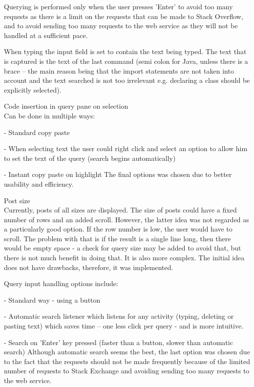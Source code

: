 \documentclass{l4proj}
\begin{document}
Querying is performed only when the user presses 'Enter' to avoid too many requests as there is a limit on the requests that can be made to Stack Overflow, and to avoid sending too many requests to the web service as they will not be handled at a sufficient pace.

When typing the input field is set to contain the text being typed. The text
that is captured is the text of the last command (semi colon for Java, unless 
there is a brace – the main reason being that the import statements are not
taken into account and the text searched is not too irrelevant e.g. declaring a
class should be explicitly selected).

Code insertion in query pane on selection\\
Can be done in multiple ways:

- Standard copy paste

- When selecting text the user could right click and select an option to allow him to set the text of the query (search begins automatically) 

- Instant copy paste on highlight
The final options was chosen due to better usability and efficiency.

Post size\\
Currently, posts of all sizes are displayed. The size of posts could have a fixed number of rows and an added scroll. However, the latter idea was not regarded as a particularly good option. If the row number is low, the user would have to scroll. The problem with that is if the result is a single line long, then there would be empty space - a check for query size may be added to avoid that, but there is not much benefit in doing that. It is also more complex. The initial idea does not have drawbacks, therefore, it was implemented.

Query input handling options include:

- Standard way - using a button

- Automatic search listener which listens for any activity (typing, deleting or pasting text) which saves time – one less click per query - and is more intuitive.

- Search on 'Enter' key pressed (faster than a button, slower than automatic search)
Although automatic search seems the best, the last option was chosen due to the fact that the requests should not be made frequently because of the limited number of requests to Stack Exchange and avoiding sending too many requests to the web service.
\end{document}
